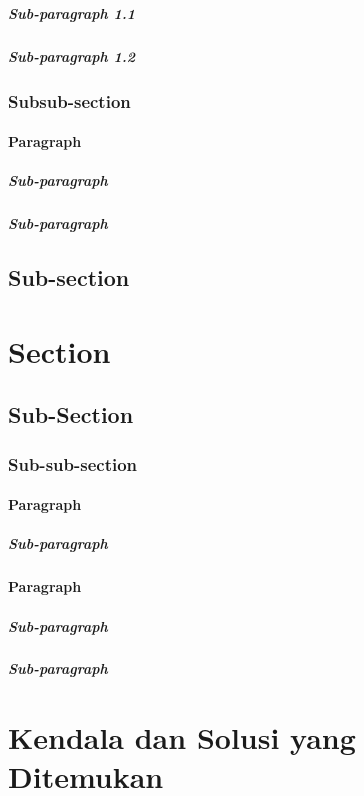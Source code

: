 \subparagraph{Sub-paragraph 1.1}

\lipsum[17-18]

\subparagraph{Sub-paragraph 1.2}

\lipsum[19-20]

\subsubsection{Subsub-section}

\lipsum[21-22]

\paragraph{Paragraph}

\subparagraph{Sub-paragraph}

\subparagraph{Sub-paragraph}

\subsection{Sub-section}

\lipsum[25-26]

\section{Section}

\subsection{Sub-Section}

\subsubsection{Sub-sub-section}

\paragraph{Paragraph}

\subparagraph{Sub-paragraph}

\lipsum[27]

\paragraph{Paragraph}

\subparagraph{Sub-paragraph}
\subparagraph{Sub-paragraph}


\section{Kendala dan Solusi yang Ditemukan}